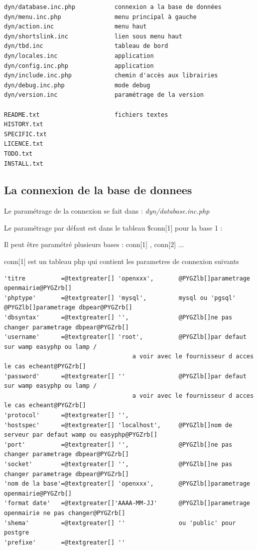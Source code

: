 \documentclass[letterpaper,10pt,french]{manual}
\begin{document}
\begin{Verbatim}[commandchars=@\[\]]
dyn/database.inc.php           connexion a la base de données
dyn/menu.inc.php               menu principal à gauche
dyn/action.inc                 menu haut
dyn/shortslink.inc             lien sous menu haut
dyn/tbd.inc                    tableau de bord
dyn/locales.inc                application
dyn/config.inc.php             application
dyn/include.inc.php            chemin d'accès aux librairies
dyn/debug.inc.php              mode debug
dyn/version.inc                paramétrage de la version

README.txt                     fichiers textes
HISTORY.txt
SPECIFIC.txt
LICENCE.txt
TODO.txt
INSTALL.txt
\end{Verbatim}


\subsection{La connexion de la base de donnees}

Le paramétrage de la connexion se fait dans : \emph{dyn/database.inc.php}

Le paramétrage par défaut est dans le tableau \$conn{[}1{]} pour la base 1 :

Il peut être paramétré plusieurs bases : conn{[}1{]} , conn{[}2{]} ...

conn{[}1{]} est un tableau php qui contient les parametres de connexion suivants

\begin{Verbatim}[commandchars=@\[\]]
'titre          =@textgreater[] 'openxxx',       @PYGZlb[]parametrage openmairie@PYGZrb[]
'phptype'       =@textgreater[] 'mysql',         mysql ou 'pgsql' @PYGZlb[]parametrage dbpear@PYGZrb[]
'dbsyntax'      =@textgreater[] '',              @PYGZlb[]ne pas changer parametrage dbpear@PYGZrb[]
'username'      =@textgreater[] 'root',          @PYGZlb[]par defaut sur wamp easyphp ou lamp /
                                    a voir avec le fournisseur d acces le cas echeant@PYGZrb[]
'password'      =@textgreater[] ''               @PYGZlb[]par defaut sur wamp easyphp ou lamp /
                                    a voir avec le fournisseur d acces le cas echeant@PYGZrb[]
'protocol'      =@textgreater[] '',
'hostspec'      =@textgreater[] 'localhost',     @PYGZlb[]nom de serveur par defaut wamp ou easyphp@PYGZrb[]
'port'          =@textgreater[] '',              @PYGZlb[]ne pas changer parametrage dbpear@PYGZrb[]
'socket'        =@textgreater[] '',              @PYGZlb[]ne pas changer parametrage dbpear@PYGZrb[]
'nom de la base'=@textgreater[] 'openxxx',       @PYGZlb[]parametrage openmairie@PYGZrb[]
'format date'   =@textgreater[]'AAAA-MM-JJ'      @PYGZlb[]parametrage openmairie ne pas changer@PYGZrb[]
'shema'         =@textgreater[] ''               ou 'public' pour postgre
'prefixe'       =@textgreater[] ''
\end{Verbatim}
\end{document}
